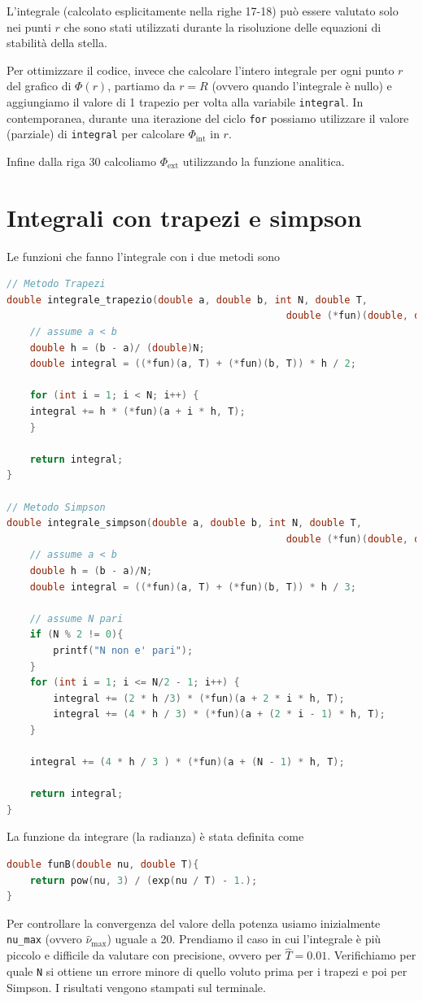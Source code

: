 \documentclass[a4paper, titlepage]{article}
\begin{document}
L'integrale (calcolato esplicitamente nella righe 17-18) può essere valutato
solo nei punti $r$ che sono stati utilizzati durante la risoluzione delle
equazioni di stabilità della stella.

Per ottimizzare il codice, invece che calcolare l'intero integrale per ogni
punto $r$ del grafico di $\Phi(r)$, partiamo da $r = R$ (ovvero quando
l'integrale è nullo) e aggiungiamo il valore di 1 trapezio per volta alla
variabile \texttt{integral}. In contemporanea, durante una iterazione del ciclo
\texttt{for} possiamo utilizzare il valore (parziale) di \texttt{integral} per
calcolare $\Phi_\text{int}$ in $r$.

Infine dalla riga 30 calcoliamo $\Phi_\text{ext}$ utilizzando la funzione
analitica.


\section{Integrali con trapezi e simpson} \label{ap:integrali}

Le funzioni che fanno l'integrale con i due metodi sono

\begin{lstlisting}[language=C]
// Metodo Trapezi
double integrale_trapezio(double a, double b, int N, double T,
                                                double (*fun)(double, double)){
    // assume a < b
    double h = (b - a)/ (double)N;
    double integral = ((*fun)(a, T) + (*fun)(b, T)) * h / 2;

    for (int i = 1; i < N; i++) {
    integral += h * (*fun)(a + i * h, T);
    }

    return integral;
}

// Metodo Simpson
double integrale_simpson(double a, double b, int N, double T,
                                                double (*fun)(double, double)){
    // assume a < b
    double h = (b - a)/N;
    double integral = ((*fun)(a, T) + (*fun)(b, T)) * h / 3;

    // assume N pari
    if (N % 2 != 0){
        printf("N non e' pari");
    }
    for (int i = 1; i <= N/2 - 1; i++) {
        integral += (2 * h /3) * (*fun)(a + 2 * i * h, T);
        integral += (4 * h / 3) * (*fun)(a + (2 * i - 1) * h, T);
    }

    integral += (4 * h / 3 ) * (*fun)(a + (N - 1) * h, T);

    return integral;
}
\end{lstlisting}

La funzione da integrare (la radianza) è stata definita come
\begin{lstlisting}[language=C]
double funB(double nu, double T){
    return pow(nu, 3) / (exp(nu / T) - 1.);
}
\end{lstlisting}
Per controllare la convergenza del valore della potenza usiamo inizialmente
\texttt{nu\_max} (ovvero $\hat \nu_\text{max}$) uguale a 20.
Prendiamo il caso in cui l'integrale è più piccolo e difficile da valutare con
precisione, ovvero per $\hat T = 0.01$.
Verifichiamo per quale \texttt{N} si ottiene un errore minore di quello voluto
prima per i trapezi e poi per Simpson.
I risultati vengono stampati sul terminale.
\end{document}
